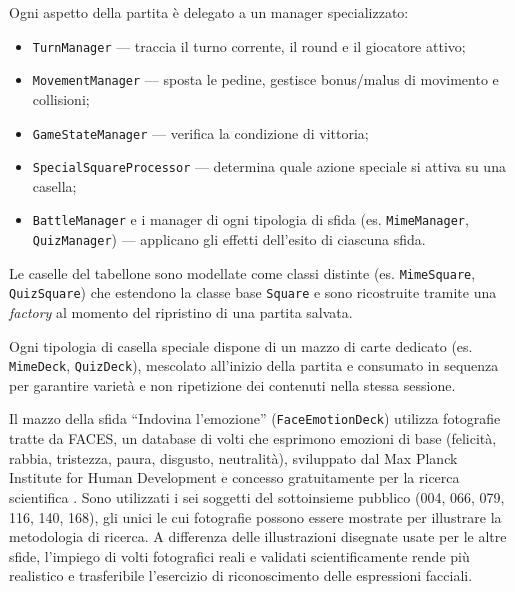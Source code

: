 \documentclass[12pt]{report}
\begin{document}
Ogni aspetto della partita è delegato a un manager specializzato:

\begin{itemize}
    \item \texttt{TurnManager} --- traccia il turno corrente, il round e il giocatore attivo;
    \item \texttt{MovementManager} --- sposta le pedine, gestisce bonus/malus di movimento e collisioni;
    \item \texttt{GameStateManager} --- verifica la condizione di vittoria;
    \item \texttt{SpecialSquareProcessor} --- determina quale azione speciale si attiva su una casella;
    \item \texttt{BattleManager} e i manager di ogni tipologia di sfida (es. \texttt{MimeManager}, \texttt{QuizManager}) --- applicano gli effetti dell'esito di ciascuna sfida.
\end{itemize}

Le caselle del tabellone sono modellate come classi distinte (es. \texttt{MimeSquare}, \texttt{QuizSquare}) che estendono la classe base \texttt{Square} e sono ricostruite tramite una \textit{factory} al momento del ripristino di una partita salvata.

Ogni tipologia di casella speciale dispone di un mazzo di carte dedicato (es. \texttt{MimeDeck}, \texttt{QuizDeck}), mescolato all'inizio della partita e consumato in sequenza per garantire varietà e non ripetizione dei contenuti nella stessa sessione.

Il mazzo della sfida ``Indovina l'emozione'' (\texttt{FaceEmotionDeck}) utilizza fotografie tratte da FACES, un database di volti che esprimono emozioni di base (felicità, rabbia, tristezza, paura, disgusto, neutralità), sviluppato dal Max Planck Institute for Human Development e concesso gratuitamente per la ricerca scientifica \cite{ebner2010faces}. Sono utilizzati i sei soggetti del sottoinsieme pubblico (004, 066, 079, 116, 140, 168), gli unici le cui fotografie possono essere mostrate per illustrare la metodologia di ricerca. A differenza delle illustrazioni disegnate usate per le altre sfide, l'impiego di volti fotografici reali e validati scientificamente rende più realistico e trasferibile l'esercizio di riconoscimento delle espressioni facciali.
\end{document}
